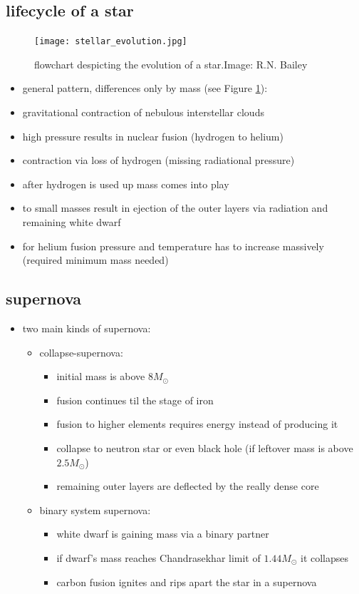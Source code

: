 \documentclass[a4paper, 11pt]{article}
\begin{document}
    \subsection{lifecycle of a star}
      \begin{figure}
        \label{ev}
        \texttt{[image: stellar\_evolution.jpg]}
        \caption{flowchart despicting the evolution of a star.\hfill Image: R.N. Bailey}
      \end{figure}
      \begin{itemize}
        \item general pattern, differences only by mass (see Figure \ref{ev}):
          \item gravitational contraction of nebulous interstellar clouds
          \item high pressure results in nuclear fusion (hydrogen to helium)
          \item contraction via loss of hydrogen (missing radiational pressure)
          \item after hydrogen is used up mass comes into play
          \item to small masses result in ejection of the outer layers via radiation and remaining white dwarf
          \item for helium fusion pressure and temperature has to increase massively (required minimum mass needed)
      \end{itemize}
    \subsection{supernova}
      \begin{itemize}
        \item two main kinds of supernova:
          \begin{itemize}
            \item collapse-supernova:
              \begin{itemize}
                \item initial mass is above $8M_\odot$
                \item fusion continues til the stage of iron
                \item fusion to higher elements requires energy instead of producing it
                \item collapse to neutron star or even black hole (if leftover mass is above $2.5M_\odot$)
                \item remaining outer layers are deflected by the really dense core
              \end{itemize}
            \item binary system supernova:
              \begin{itemize}
                \item white dwarf is gaining mass via a binary partner
                \item if dwarf's mass reaches Chandrasekhar limit of $1.44M_\odot$ it collapses
                \item carbon fusion ignites and rips apart the star in a supernova
              \end{itemize}
          \end{itemize}
      \end{itemize}
\end{document}

